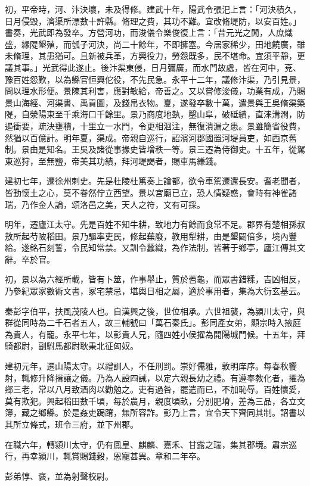 \begin{pinyinscope}
初，平帝時，河、汴決壞，未及得修。建武十年，陽武令張汜上言：「河決積久，日月侵毀，濟渠所漂數十許縣。脩理之費，其功不難。宜改脩堤防，以安百姓。」書奏，光武即為發卒。方營河功，而浚儀令樂俊復上言：「昔元光之閒，人庶熾盛，緣隄墾殖，而瓠子河決，尚二十餘年，不即擁塞。今居家稀少，田地饒廣，雖未脩理，其患猶可。且新被兵革，方興役力，勞怨既多，民不堪命。宜須平靜，更議其事。」光武得此遂止。後汴渠東侵，日月彌廣，而水門故處，皆在河中，兗、豫百姓怨歎，以為縣官恒興佗役，不先民急。永平十二年，議修汴渠，乃引見景，問以理水形便。景陳其利害，應對敏給，帝善之。又以嘗修浚儀，功業有成，乃賜景山海經、河渠書、禹貢圖，及錢帛衣物。夏，遂發卒數十萬，遣景與王吳脩渠築隄，自滎陽東至千乘海口千餘里。景乃商度地埶，鑿山阜，破砥績，直涞溝澗，防遏衝要，疏決壅積，十里立一水門，令更相洄注，無復潰漏之患。景雖簡省役費，然猶以百億計。明年夏，渠成。帝親自巡行，詔濱河郡國置河堤員吏，如西京舊制。景由是知名。王吳及諸從事掾史皆增秩一等。景三遷為侍御史。十五年，從駕東巡狩，至無鹽，帝美其功績，拜河堤謁者，賜車馬縑錢。

建初七年，遷徐州刺史。先是杜陵杜篤奏上論都，欲令車駕遷還長安。耆老聞者，皆動懷土之心，莫不眷然佇立西望。景以宮廟已立，恐人情疑惑，會時有神雀諸瑞，乃作金人論，頌洛邑之美，天人之符，文有可採。

明年，遷廬江太守。先是百姓不知牛耕，致地力有餘而食常不足。郡界有楚相孫叔敖所起芍陂稻田。景乃驅率吏民，修起蕪廢，教用犁耕，由是墾闢倍多，境內豐給。遂銘石刻誓，令民知常禁。又訓令蠶織，為作法制，皆著于鄉亭，廬江傳其文辭。卒於官。

初，景以為六經所載，皆有卜筮，作事舉止，質於蓍龜，而眾書錯糅，吉凶相反，乃參紀眾家數術文書，冢宅禁忌，堪輿日相之屬，適於事用者，集為大衍玄基云。

秦彭字伯平，扶風茂陵人也。自漢興之後，世位相承。六世祖襲，為潁川太守，與群從同時為二千石者五人，故三輔號曰「萬石秦氏」。彭同產女弟，顯宗時入掖庭為貴人，有寵。永平七年，以彭貴人兄，隨四姓小侯擢為開陽城門候。十五年，拜騎都尉，副駙馬都尉耿秉北征匈奴。

建初元年，遷山陽太守。以禮訓人，不任刑罰。崇好儒雅，敦明庠序。每春秋饗射，輒修升降揖讓之儀。乃為人設四誡，以定六親長幼之禮。有遵奉教化者，擢為鄉三老，常以八月致酒肉以勸勉之。吏有過咎，罷遣而已，不加恥辱。百姓懷愛，莫有欺犯。興起稻田數千頃，每於農月，親度頃畝，分別肥塉，差為三品，各立文簿，藏之鄉縣。於是姦吏跼蹐，無所容詐。彭乃上言，宜令天下齊同其制。詔書以其所立條式，班令三府，並下州郡。

在職六年，轉潁川太守，仍有鳳皇、麒麟、嘉禾、甘露之瑞，集其郡境。肅宗巡行，再幸潁川，輒賞賜錢穀，恩寵甚異。章和二年卒。

彭弟惇、褒，並為射聲校尉。


\end{pinyinscope}
